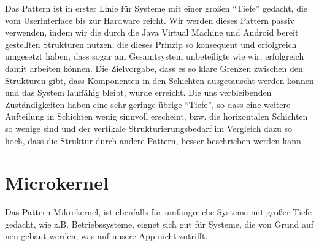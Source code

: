 \documentclass{scrreprt}
\begin{document}
Das Pattern ist in erster Linie für Systeme mit einer großen “Tiefe” gedacht, die vom Userinterface bis zur Hardware reicht. Wir werden dieses Pattern passiv verwenden, indem wir die durch die Java Virtual Machine und Android bereit gestellten Strukturen nutzen, die dieses Prinzip so konsequent und erfolgreich umgesetzt haben, dass sogar am Gesamtsystem unbeteiligte wie wir, erfolgreich damit arbeiten können. Die Zielvorgabe, dass es so klare Grenzen zwischen den Strukturen gibt, dass Komponenten in den Schichten ausgetauscht werden können und das System lauffähig bleibt, wurde erreicht.
Die uns verbleibenden Zuständigkeiten haben eine sehr geringe übrige “Tiefe”, so dass eine weitere Aufteilung in Schichten wenig sinnvoll erscheint, bzw. die horizontalen Schichten so wenige sind und der vertikale Strukturierungsbedarf im Vergleich dazu so hoch, dass die Struktur durch andere Pattern, besser beschrieben werden kann.

\chapter{Microkernel}

Das Pattern Mikrokernel, ist ebenfalls für umfangreiche Systeme mit großer Tiefe gedacht, wie z.B. Betriebssysteme, eignet sich gut für Systeme, die von Grund auf neu gebaut werden, was auf unsere App nicht zutrifft.
\end{document}
